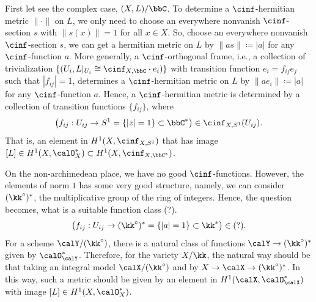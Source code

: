 First let see the complex case, $(X,L)/\bbC$.
To determine a $\cinf$-hermitian metric $\|\cdot\|$ on $L$, we only need to choose an everywhere nonvanish $\cinf$-section $s$ with $\|s(x)\| = 1$ for all $x \in X$.
So, choose an everywhere nonvanish $\cinf$-section $s$, we can get a hermitian metric on $L$ by $\|as\| \coloneqq |a|$ for any $\cinf$-function $a$.
More generally, a $\cinf$-orthogonal frame, i.e., a collection of trivialization $\{(U_i,L|_{U_i} \cong \cinf_{X,\bbC} \cdot e_i)\}$ with transition function $e_i = f_{ij} e_j$ such that $|f_{ij}|=1$, determines a $\cinf$-hermitian metric on $L$ by $\|ae_i\| \coloneqq |a|$ for any $\cinf$-function $a$.
Hence, a $\cinf$-hermitian metric is determined by a collection of transition functions $\{f_{ij}\}$, where
\[ \bigl( f_{ij}: U_{ij} \to S^1 = \{|z|=1\} \subset \bbC^* \bigr) \in \cinf_{X,S^1}(U_{ij}). \]
That is, an element in $H^1(X, \cinf_{X,S^1})$ that has image $[L] \in H^1(X,\calO_X^*) \subset H^1(X,\cinf_{X,\bbC^*})$.

On the non-archimedean place, we have no good $\cinf$-functions.
However, the elements of norm $1$ has some very good structure, namely, we can consider $(\kk^\circ)^*$, the multiplicative group of the ring of integers.
Hence, the question becomes, what is a suitable function class (?).
\[ \bigl( f_{ij}: U_{ij} \to (\kk^\circ)^* = \{|a|=1\} \subset \kk^*\bigr) \in (?). \]
For a scheme $\calY/(\kk^\circ)$, there is a natural class of functions $\calY \to (\kk^\circ)^*$ given by $\calO_\calY^*$.
Therefore, for the variety $X/\kk$, the natural way should be that taking an integral model $\calX/(\kk^\circ)$ and by $X \to \calX \to (\kk^\circ)^*$.
In this way, such a metric should be given by an element in $H^1(\calX,\calO_\calX^*)$ with image $[L] \in H^1(X,\calO_X^*)$.

